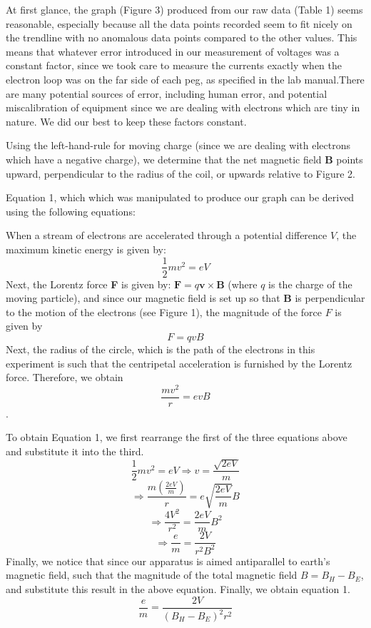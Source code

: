 \documentclass[letterpaper]{article}
\begin{document}
At first glance, the graph (Figure 3) produced from our raw data (Table 1) seems reasonable, especially
because all the data points recorded seem to fit nicely on the trendline with
no anomalous data points compared to the other values. This means that whatever error
introduced in our measurement of voltages was a constant factor, since we took care
to measure the currents exactly when the electron loop was on the far side of each peg, as specified in the
lab manual.There are many potential sources of error, including human error, and potential miscalibration of equipment since we are dealing
with electrons which are tiny in nature. We did our best to keep these factors constant.

Using the left-hand-rule for moving charge (since we are
dealing with electrons which have a negative charge), we determine that the net magnetic field \textbf{B}
points upward, perpendicular to the radius of the coil, or upwards relative to Figure 2.

Equation 1, which which was manipulated to produce our graph can be derived using the following equations:

\noindent When a stream of electrons are accelerated through a potential difference $V$, the maximum
kinetic energy is given by:
$$\frac{1}{2}mv^2 = eV$$
Next, the Lorentz force \textbf{F} is given by:
$\textbf{F}=q\textbf{v}\times \textbf{B}$
(where $q$ is the charge of the moving particle), and since our magnetic field is set up so that \textbf{B} is perpendicular to the motion of the electrons (see Figure 1),
the magnitude of the force $F$ is given by $$F=qvB$$
Next, the radius of the circle, which is the path of the electrons in this experiment is such that
the centripetal acceleration is furnished by the Lorentz force. Therefore, we obtain $$\frac{mv^2}{r}=evB$$.

\noindent To obtain Equation 1, we first rearrange the first of the three equations above and substitute it into the third.
$$\frac{1}{2}mv^2 = eV \Rightarrow v=\frac{\sqrt{2eV}}{m}$$
$$\Rightarrow \frac{m(\frac{2eV}{m})}{r}=e\sqrt{\frac{2eV}{m}}B$$
$$\Rightarrow \frac{4V^2}{r^2}=\frac{2eV}{m}B^2$$
$$\Rightarrow \frac{e}{m} = \frac{2V}{r^2B^2}$$
Finally, we notice that since our apparatus is aimed antiparallel to earth's magnetic field, such that
the magnitude of the total magnetic field $B=B_H-B_E$, and substitute this result in the above equation.
Finally, we obtain equation 1.
$$\frac{e}{m} = \frac{2V}{(B_H-B_E)^2r^2}$$
\end{document}
